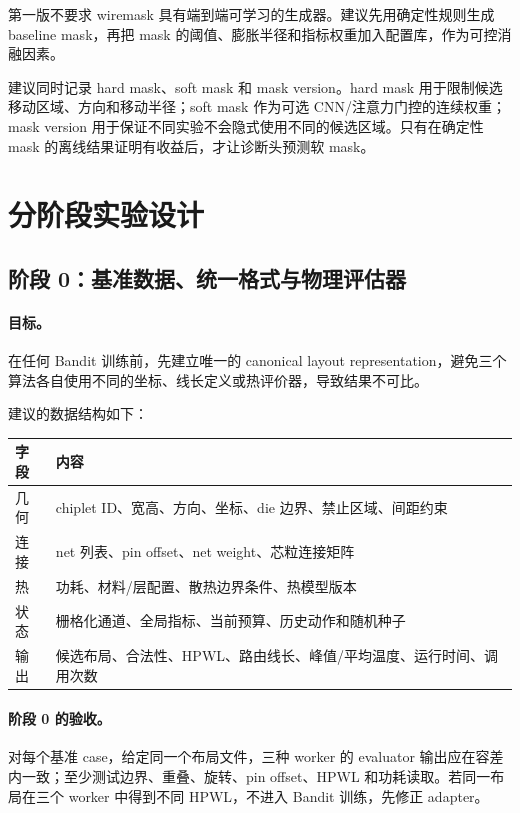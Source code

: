 \documentclass[UTF8,a4paper,11pt]{ctexart}
\begin{document}
第一版不要求 wiremask 具有端到端可学习的生成器。建议先用确定性规则生成 baseline mask，再把 mask 的阈值、膨胀半径和指标权重加入配置库，作为可控消融因素。

建议同时记录 hard mask、soft mask 和 mask version。hard mask 用于限制候选移动区域、方向和移动半径；soft mask 作为可选 CNN/注意力门控的连续权重；mask version 用于保证不同实验不会隐式使用不同的候选区域。只有在确定性 mask 的离线结果证明有收益后，才让诊断头预测软 mask。

\section{分阶段实验设计}

\subsection{阶段 0：基准数据、统一格式与物理评估器}

\paragraph{目标。}在任何 Bandit 训练前，先建立唯一的 canonical layout representation，避免三个算法各自使用不同的坐标、线长定义或热评价器，导致结果不可比。

建议的数据结构如下：

\begin{table}[htbp]
\centering
\small
\begin{tabularx}{\textwidth}{>{\raggedright\arraybackslash}p{}X}
\toprule
字段 & 内容 \\
\midrule
几何 & chiplet ID、宽高、方向、坐标、die 边界、禁止区域、间距约束 \\
连接 & net 列表、pin offset、net weight、芯粒连接矩阵 \\
热 & 功耗、材料/层配置、散热边界条件、热模型版本 \\
状态 & 栅格化通道、全局指标、当前预算、历史动作和随机种子 \\
输出 & 候选布局、合法性、HPWL、路由线长、峰值/平均温度、运行时间、调用次数 \\
\bottomrule
\end{tabularx}
\end{table}

\paragraph{阶段 0 的验收。} 对每个基准 case，给定同一个布局文件，三种 worker 的 evaluator 输出应在容差内一致；至少测试边界、重叠、旋转、pin offset、HPWL 和功耗读取。若同一布局在三个 worker 中得到不同 HPWL，不进入 Bandit 训练，先修正 adapter。
\end{document}
